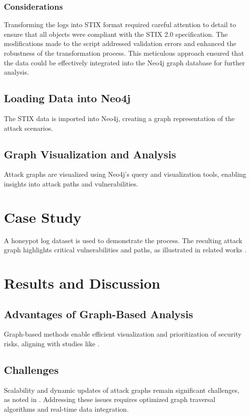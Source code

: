 \documentclass[conference]{IEEEtran}
\begin{document}
\subsubsection{Considerations}

Transforming the logs into STIX format required careful attention to detail to ensure that all objects were compliant with the STIX 2.0 specification. The modifications made to the script addressed validation errors and enhanced the robustness of the transformation process. This meticulous approach ensured that the data could be effectively integrated into the Neo4j graph database for further analysis.



\subsection{Loading Data into Neo4j}
The STIX data is imported into Neo4j, creating a graph representation of the attack scenarios.

\subsection{Graph Visualization and Analysis}
Attack graphs are visualized using Neo4j's query and visualization tools, enabling insights into attack paths and vulnerabilities.

\section{Case Study}
A honeypot log dataset is used to demonstrate the process. The resulting attack graph highlights critical vulnerabilities and paths, as illustrated in related works \cite{banati2022attackgraphs}.

\section{Results and Discussion}
\subsection{Advantages of Graph-Based Analysis}
Graph-based methods enable efficient visualization and prioritization of security risks, aligning with studies like \cite{banati2022attackgraphs}.

\subsection{Challenges}
Scalability and dynamic updates of attack graphs remain significant challenges, as noted in \cite{simonnagy2022attackgraphs}. Addressing these issues requires optimized graph traversal algorithms and real-time data integration.
\end{document}
